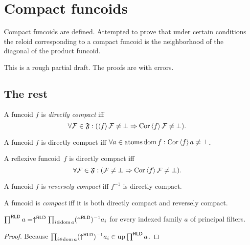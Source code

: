 \chapter{Compact funcoids}

Compact funcoids are defined. Attempted to prove that under certain conditions the
reloid corresponding to a compact funcoid is the neighborhood of the diagonal
of the product funcoid.

This is a rough partial draft. The proofs are with errors.


\section{The rest}

\begin{defn}
  A funcoid $f$ is \emph{directly compact} iff
  \[ \forall \mathcal{F} \in \mathfrak{F}: (\left\langle f\right\rangle
     \mathcal{F} \neq \bot \Rightarrow \operatorname{Cor} \left\langle f\right\rangle \mathcal{F}
     \neq \bot). \]
\end{defn}

\begin{obvious}
A funcoid $f$ is directly compact iff $\forall a \in \operatorname{atoms} \operatorname{dom} f :
\operatorname{Cor} \left\langle f\right\rangle a \neq \bot$.
\end{obvious}

\begin{obvious}
A reflexive funcoid~$f$ is directly compact iff
\[ \forall \mathcal{F} \in \mathfrak{F}: (\mathcal{F} \neq \bot \Rightarrow \operatorname{Cor} \left\langle f\right\rangle \mathcal{F}
     \neq \bot). \]
\end{obvious}

\begin{defn}
  A funcoid $f$ is \emph{reversely compact} iff $f^{- 1}$ is directly
  compact.
\end{defn}

\begin{defn}
  A funcoid is \emph{compact} iff it is both directly compact and reversely
  compact.
\end{defn}

\begin{prop}
  $\prod^{\mathsf{RLD}} a = \uparrow^{\mathsf{RLD}} \prod_{i \in
  \operatorname{dom} a} (\uparrow^{\mathsf{RLD}})^{- 1} a_i$ for every indexed
  family $a$ of principal filters.
\end{prop}

\begin{proof}
Because $\prod_{i \in \operatorname{dom} a} (\uparrow^{\mathsf{RLD}})^{- 1} a_i
\in \operatorname{up} \prod^{\mathsf{RLD}} a$.
\end{proof}


